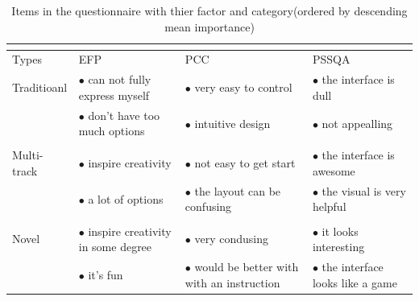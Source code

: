 \begin{table}[h]
  \centering
  \begin{tabular}{ |p{2cm}|p{3.2cm}|p{3.2cm}|p{3.2cm}|}
   \multicolumn{4}{l}{} \\
   \hline
   Types & EFP  & PCC  & PSSQA \\
   \hline
   Traditioanl & $\bullet$ can not fully express myself & $\bullet$ very easy to control & $\bullet$ the interface is dull\\
   & $\bullet$ don't have too much options &  $\bullet$ intuitive design & $\bullet$ not appealling\\
   & & &\\
   \hline
   Multi-track  & $\bullet$ inspire creativity & $\bullet$ not easy to get start & $\bullet$ the interface is awesome\\
   & $\bullet$ a lot of options& $\bullet$ the layout can be confusing & $\bullet$ the visual  is very helpful\\
   & & &\\
   \hline
   Novel & $\bullet$ inspire creativity in some degree & $\bullet$ very condusing & $\bullet$ it looks interesting\\
   & $\bullet$ it's fun & $\bullet$ would be better with with an instruction & $\bullet$ the interface looks like a game\\

   \hline
  \end{tabular}
  \caption[l]{Items in the questionnaire with thier factor and category(ordered by descending mean importance)}
  \label{tab: suduko}
\end{table}

\bigskip

\clearpage
